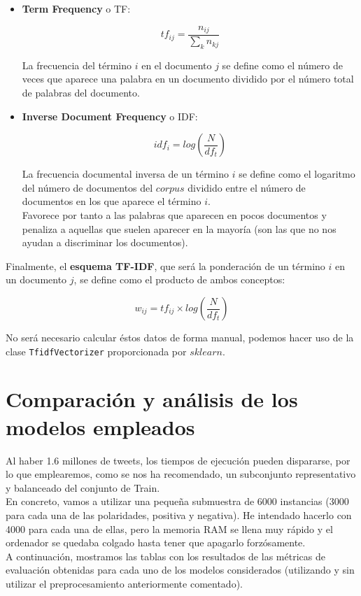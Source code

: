 \documentclass[a4paper,12pt]{report}
\begin{document}
\begin{itemize}

\item \textbf{Term Frequency} o TF:

\[ tf_{ij} = \frac{n_{ij}}{\sum_{k} n_{kj}}  \]

{\setlength{\parindent}{0cm}
La frecuencia del término $i$ en el documento $j$ se define como el número de veces que aparece una palabra en un documento dividido por el número total de palabras del documento. }


\item \textbf{Inverse Document Frequency} o IDF:

\[ idf_i = log \left( \frac{N}{df_t} \right) \]

{\setlength{\parindent}{0cm}
La frecuencia documental inversa de un término $i$ se define como el logaritmo del número de documentos del $corpus$ dividido entre el número de documentos en los que aparece el término $i$.} \vspace{2mm}\\
Favorece por tanto a las palabras que aparecen en pocos documentos y penaliza a aquellas que suelen aparecer en la mayoría (son las que no nos ayudan a discriminar los documentos). 

\end{itemize}
\vspace{2mm}

{\setlength{\parindent}{0cm}
Finalmente, el \textbf{esquema TF-IDF}, que será la ponderación de un término $i$ en un documento $j$, se define como el producto de ambos conceptos:}

\[ w_{ij} = tf_{ij} \times log \left( \frac{N}{df_t} \right) \] 

\vspace{2mm}
{\setlength{\parindent}{0cm}
No será necesario calcular éstos datos de forma manual, podemos hacer uso de la clase
\texttt{TfidfVectorizer} proporcionada por $sklearn$. }
\vspace{4mm}

\section{Comparación y análisis de los modelos empleados}

{\setlength{\parindent}{0cm}
Al haber 1.6 millones de tweets, los tiempos de ejecución pueden dispararse, por lo
que emplearemos, como se nos ha recomendado, un subconjunto representativo y
balanceado del conjunto de Train.}
\vspace{2mm}\\
En concreto, vamos a utilizar una pequeña submuestra de 6000 instancias (3000 para cada una de las polaridades, positiva y negativa). He intendado hacerlo con 4000 para cada una de ellas, pero la memoria RAM se llena muy rápido y el ordenador se quedaba colgado hasta tener que apagarlo forzósamente. 
\vspace{2mm}\\
A continuación, mostramos las tablas con los resultados de las métricas de evaluación obtenidas para cada uno de los modelos considerados (utilizando y sin utilizar el preprocesamiento anteriormente comentado).
\clearpage
\end{document}
